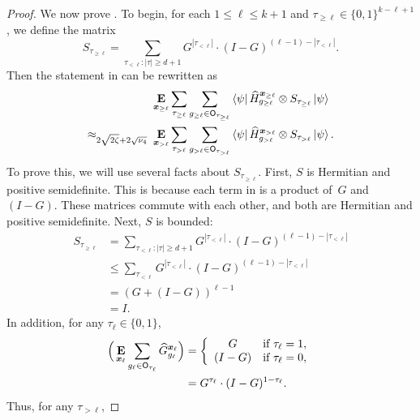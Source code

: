 \begin{proof}
We now prove .
To begin, for each $1 \leq \ell \leq k+1$ and $\tau_{\geq \ell} \in \{0, 1\}^{k - \ell + 1}$,
we define the matrix
\begin{equation}\label{eq:S-def}
S_{\tau_{\geq \ell}} = \sum_{\tau_{< \ell} : |\tau| \geq d+1} G^{|\tau_{<\ell}|}\cdot (I-G)^{(\ell-1)-|\tau_{<\ell}|}.
\end{equation}
Then the statement in  can be rewritten as
\begin{align}
&\mathop{\bf E\/}_{{\boldsymbol{x}}_{\geq \ell}} \sum_{\tau_{\geq \ell}}  \sum_{g_{\geq \ell} \in \mathsf{O}_{\tau_{\geq \ell}}}
	\bra{\psi} \widehat{H}^{{\boldsymbol{x}}_{\geq \ell}}_{g_{\geq \ell}} \otimes S_{\tau_{\geq \ell}}\ket{\psi}\nonumber\\
\approx_{2\sqrt{2\zeta} + 2 \sqrt{\nu_4}}~&\mathop{\bf E\/}_{{\boldsymbol{x}}_{> \ell}} \sum_{\tau_{>\ell}} \sum_{g_{>\ell} \in \mathsf{O}_{\tau_{> \ell}}}
	\bra{\psi} \widehat{H}^{{\boldsymbol{x}}_{>\ell}}_{g_{>\ell}} \otimes S_{\tau_{>\ell}} \ket{\psi}.
	\label{eq:i-think-this-is-what-i'm-supposed-to-prove-2}
\end{align}
To prove this, we will use several facts about $S_{\tau_{\geq \ell}}$.
First, $S$ is Hermitian and positive semidefinite.
This is because each term in 
is a product of~$G$ and $(I-G)$.
These matrices commute with each other,
and both are Hermitian and positive semidefinite.
Next, $S$ is bounded:
\begin{align}
S_{\tau_{\geq \ell}}
&= \sum_{\tau_{< \ell} : |\tau| \geq d+1} G^{|\tau_{<\ell}|}\cdot (I-G)^{(\ell-1)-|\tau_{<\ell}|}\nonumber\\
&\leq \sum_{\tau_{< \ell} } G^{|\tau_{<\ell}|}\cdot (I-G)^{(\ell-1)-|\tau_{<\ell}|}\nonumber\\
& = (G + (I-G))^{\ell-1}\nonumber\\
& = I. \label{eq:S-bound}
\end{align}
In addition, for any $\tau_{\ell} \in \{0, 1\}$,
\begin{align}
\Big(\mathop{\bf E\/}_{{\boldsymbol{x}}_{\ell}} \sum_{g_{\ell} \in \mathsf{O}_{\tau_{\ell}}} \widehat{G}^{{\boldsymbol{x}}_{\ell}}_{g_{\ell}}\Big)
& = \left\{ \begin{array}{cl}
		G & \text{if } \tau_{\ell} = 1,\\
		(I-G) & \text{if } \tau_{\ell} = 0,
	\end{array}\right.\nonumber\\
&= G^{\tau_{\ell}} \cdot (I - G)^{1 - \tau_{\ell}}.\label{eq:explicit-formula-for-G-expectation}
\end{align}
Thus, for any $\tau_{> \ell}$,

\end{proof}
